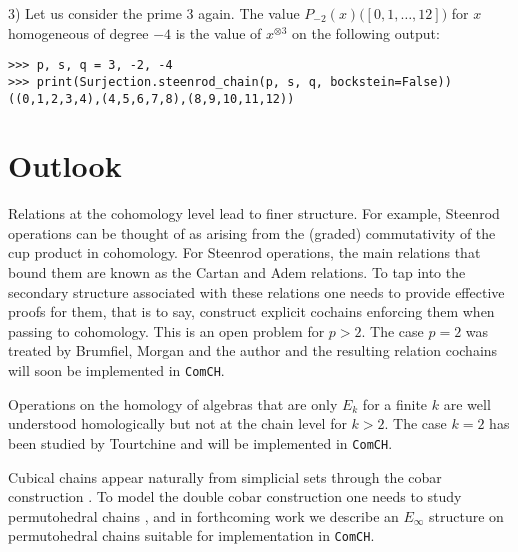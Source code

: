 \documentclass{amsart}
\newcommand{\comch}{\texttt{ComCH}}
\begin{document}
3) Let us consider the prime $3$ again.
The value $P_{-2}(x)\big([0,1,\dots,12]\big)$ for $x$ homogeneous of degree $-4$ is the value of $x^{\otimes 3}$ on the following output:

\begin{Verbatim}[frame=lines, samepage=true]
>>> p, s, q = 3, -2, -4
>>> print(Surjection.steenrod_chain(p, s, q, bockstein=False))
((0,1,2,3,4),(4,5,6,7,8),(8,9,10,11,12))
\end{Verbatim}

\section{Outlook}

Relations at the cohomology level lead to finer structure.
For example, Steenrod operations can be thought of as arising from the (graded) commutativity of the cup product in cohomology.
For Steenrod operations, the main relations that bound them are known as the Cartan and Adem relations.
To tap into the secondary structure associated with these relations one needs to provide effective proofs for them, that is to say, construct explicit cochains enforcing them when passing to cohomology.
This is an open problem for $p > 2$.
The case $p = 2$ was treated by Brumfiel, Morgan and the author \cite{medina2020cartan, medina2021adem} and the resulting relation cochains will soon be implemented in \comch.

Operations on the homology of algebras that are only $E_k$ for a finite $k$ are well understood homologically \cite{Cohen76} but not at the chain level for $k > 2$.
The case $k = 2$ has been studied by Tourtchine \cite{Tourtchine06} and will be implemented in \comch.

Cubical chains appear naturally from simplicial sets through the cobar construction \cite{adams1956cobar, Baues1980, medina2021cobar}.
To model the double cobar construction one needs to study permutohedral chains \cite{Kadeishvili2002}, and in forthcoming work we describe an $E_\infty$ structure on permutohedral chains suitable for implementation in \comch.

\sloppy
\printbibliography
\end{document}

